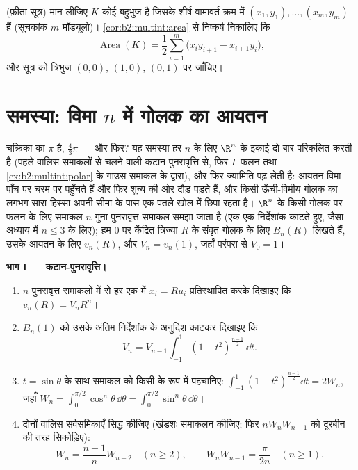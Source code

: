 \begin{exercise}[$\star\star$]\label{exo:b2:multint:12}
(फ़ीता सूत्र) मान लीजिए $K$ कोई बहुभुज है जिसके शीर्ष वामावर्त
क्रम में $(x_1,
y_1), \dots, (x_m, y_m)$ हैं (सूचकांक $m$ मॉड्यूलो)। \cref{cor:b2:multint:area} से निष्कर्ष
निकालिए कि
\[
\operatorname{Area}(K)
= \frac12\sum_{i=1}^m
\bigl(x_iy_{i+1} - x_{i+1}y_i\bigr) ,
\]
और सूत्र को त्रिभुज $(0,0)$, $(1,0)$, $(0,1)$ पर जाँचिए।
\end{exercise}

\section{समस्या: विमा $n$ में गोलक का आयतन}

\begin{problem}[{सप्ताहांत समस्या --- $V_n =
\pi^{n/2}/\Gamma(\frac n2 + 1)$, और ऊँची विमाओं की विचित्रता}]\label{pb:b2:multint:1}
चक्रिका का  $\pi$ है,  $\frac43\pi$ --- और फिर? यह
समस्या हर $n$ के लिए $\R^n$ के इकाई  दो बार परिकलित करती
है (पहले वालिस समाकलों से चलने वाली कटान-पुनरावृत्ति से, फिर $\Gamma$
फलन तथा \cref{ex:b2:multint:polar} के गाउस समाकल के द्वारा), और फिर ज्यामिति पढ़ लेती है:
आयतन विमा पाँच पर चरम पर पहुँचते हैं और फिर शून्य की ओर दौड़ पड़ते
हैं, और किसी ऊँची-विमीय गोलक का लगभग सारा हिस्सा अपनी सीमा के पास
एक पतले खोल में छिपा रहता है। $\R^n$ के किसी गोलक पर  फलन के लिए समाकल $n$-गुना
पुनरावृत्त समाकल समझा जाता है (एक-एक निर्देशांक काटते हुए, जैसा
अध्याय में $n
\leq 3$ के लिए); हम $0$ पर केंद्रित त्रिज्या $R$ के
संवृत गोलक के लिए $B_n(R)$ लिखते हैं, उसके आयतन के लिए $v_n(R)$, और $V_n =
v_n(1)$,
जहाँ परंपरा से $V_0 = 1$।

\medskip
\noindent\textbf{भाग I --- कटान-पुनरावृत्ति।}
\begin{enumerate}
  \item $n$ पुनरावृत्त समाकलों में से हर एक में $x_i = Ru_i$
        प्रतिस्थापित करके दिखाइए कि $v_n(R) = V_nR^n$।
  \item $B_n(1)$ को उसके अंतिम निर्देशांक के अनुदिश काटकर दिखाइए
        कि
        \[
        V_n = V_{n-1}\int_{-1}^{1}(1 -
        t^2)^{\frac{n-1}2}\,\dd t .
        \]
  \item $t = \sin\theta$ के साथ समाकल को किसी  के रूप में
        पहचानिए: $\int_{-1}^1(1 -
        t^2)^{\frac{n-1}2}\dd t = 2W_n$, जहाँ $W_n =
        \int_0^{\pi/2}\cos^n\theta\,\dd\theta =
        \int_0^{\pi/2}\sin^n\theta\,\dd\theta$।
  \item दोनों वालिस सर्वसमिकाएँ सिद्ध कीजिए (खंडशः समाकलन
        कीजिए; फिर $nW_nW_{n-1}$ को दूरबीन की तरह सिकोड़िए):
        \[
        W_n = \frac{n-1}nW_{n-2} \quad (n \geq 2),
        \qquad
        W_nW_{n-1} = \frac{\pi}{2n} \quad (n \geq 1).
        \]
\end{enumerate}


\end{problem}

